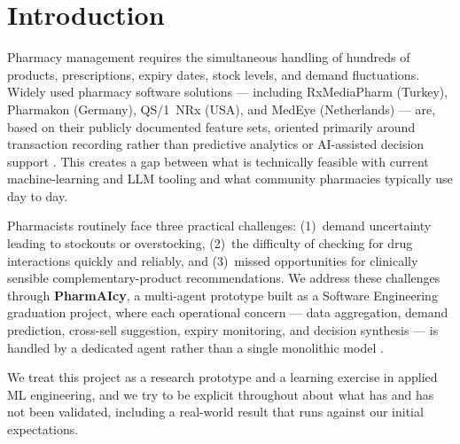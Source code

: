 \documentclass[12pt,a4paper]{article}
\begin{document}
\tableofcontents
\newpage

\section{Introduction}
\label{sec:intro}

Pharmacy management requires the simultaneous handling of hundreds of products, prescriptions, expiry dates, stock levels, and demand fluctuations. Widely used pharmacy software solutions --- including RxMediaPharm (Turkey), Pharmakon (Germany), QS/1~NRx (USA), and MedEye (Netherlands) --- are, based on their publicly documented feature sets, oriented primarily around transaction recording rather than predictive analytics or AI-assisted decision support \cite{uthayakumar2013}. This creates a gap between what is technically feasible with current machine-learning and LLM tooling and what community pharmacies typically use day to day.

Pharmacists routinely face three practical challenges: (1)~demand uncertainty leading to stockouts or overstocking, (2)~the difficulty of checking for drug interactions quickly and reliably, and (3)~missed opportunities for clinically sensible complementary-product recommendations. We address these challenges through \textbf{PharmAIcy}, a multi-agent prototype built as a Software Engineering graduation project, where each operational concern --- data aggregation, demand prediction, cross-sell suggestion, expiry monitoring, and decision synthesis --- is handled by a dedicated agent rather than a single monolithic model \cite{wooldridge2009}.

We treat this project as a research prototype and a learning exercise in applied ML engineering, and we try to be explicit throughout about what has and has not been validated, including a real-world result that runs against our initial expectations.
\end{document}
